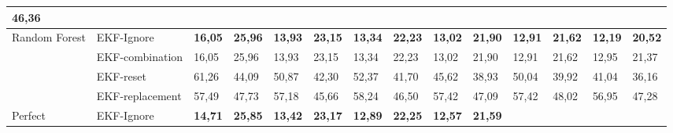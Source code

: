 \begin{table*}[]
\begin{tabular}{@{}llllllllllllll@{}}
		\multicolumn{1}{l|}{46,36} \\ \midrule
		\multicolumn{1}{|l|}{\multirow{4}{*}{Random Forest}} &
		\multicolumn{1}{l|}{EKF-Ignore} &
		\multicolumn{1}{l|}{\textbf{16,05}} &
		\multicolumn{1}{l|}{\textbf{25,96}} &
		\multicolumn{1}{l|}{\textbf{13,93}} &
		\multicolumn{1}{l|}{\textbf{23,15}} &
		\multicolumn{1}{l|}{\textbf{13,34}} &
		\multicolumn{1}{l|}{\textbf{22,23}} &
		\multicolumn{1}{l|}{\textbf{13,02}} &
		\multicolumn{1}{l|}{\textbf{21,90}} &
		\multicolumn{1}{l|}{\textbf{12,91}} &
		\multicolumn{1}{l|}{\textbf{21,62}} &
		\multicolumn{1}{l|}{\textbf{12,19}} &
		\multicolumn{1}{l|}{\textbf{20,52}} \\ \cmidrule(l){2-14} 
		\multicolumn{1}{|l|}{} &
		\multicolumn{1}{l|}{EKF-combination} &
		\multicolumn{1}{l|}{16,05} &
		\multicolumn{1}{l|}{25,96} &
		\multicolumn{1}{l|}{13,93} &
		\multicolumn{1}{l|}{23,15} &
		\multicolumn{1}{l|}{13,34} &
		\multicolumn{1}{l|}{22,23} &
		\multicolumn{1}{l|}{13,02} &
		\multicolumn{1}{l|}{21,90} &
		\multicolumn{1}{l|}{12,91} &
		\multicolumn{1}{l|}{21,62} &
		\multicolumn{1}{l|}{12,95} &
		\multicolumn{1}{l|}{21,37} \\ \cmidrule(l){2-14} 
		\multicolumn{1}{|l|}{} &
		\multicolumn{1}{l|}{EKF-reset} &
		\multicolumn{1}{l|}{61,26} &
		\multicolumn{1}{l|}{44,09} &
		\multicolumn{1}{l|}{50,87} &
		\multicolumn{1}{l|}{42,30} &
		\multicolumn{1}{l|}{52,37} &
		\multicolumn{1}{l|}{41,70} &
		\multicolumn{1}{l|}{45,62} &
		\multicolumn{1}{l|}{38,93} &
		\multicolumn{1}{l|}{50,04} &
		\multicolumn{1}{l|}{39,92} &
		\multicolumn{1}{l|}{41,04} &
		\multicolumn{1}{l|}{36,16} \\ \cmidrule(l){2-14} 
		\multicolumn{1}{|l|}{} &
		\multicolumn{1}{l|}{EKF-replacement} &
		\multicolumn{1}{l|}{57,49} &
		\multicolumn{1}{l|}{47,73} &
		\multicolumn{1}{l|}{57,18} &
		\multicolumn{1}{l|}{45,66} &
		\multicolumn{1}{l|}{58,24} &
		\multicolumn{1}{l|}{46,50} &
		\multicolumn{1}{l|}{57,42} &
		\multicolumn{1}{l|}{47,09} &
		\multicolumn{1}{l|}{57,42} &
		\multicolumn{1}{l|}{48,02} &
		\multicolumn{1}{l|}{56,95} &
		\multicolumn{1}{l|}{47,28} \\ \midrule
		\multicolumn{1}{|l|}{\multirow{4}{*}{Perfect}} &
		\multicolumn{1}{l|}{EKF-Ignore} &
		\multicolumn{1}{c|}{\textbf{14,71}} &
		\multicolumn{1}{c|}{\textbf{25,85}} &
		\multicolumn{1}{c|}{\textbf{13,42}} &
		\multicolumn{1}{c|}{\textbf{23,17}} &
		\multicolumn{1}{c|}{\textbf{12,89}} &
		\multicolumn{1}{c|}{\textbf{22,25}} &
		\multicolumn{1}{c|}{\textbf{12,57}} &
		\multicolumn{1}{c|}{\textbf{21,59}} &

\end{tabular}
\end{table*}
